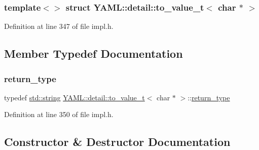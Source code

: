 \subsubsection*{template$<$$>$\newline
struct Y\+A\+M\+L\+::detail\+::to\+\_\+value\+\_\+t$<$ char $\ast$ $>$}



Definition at line 347 of file impl.\+h.



\subsection{Member Typedef Documentation}
\mbox{\label{struct_y_a_m_l_1_1detail_1_1to__value__t_3_01char_01_5_01_4_afaa36e2e46326f4b6d7c437104cc79e5}} 
\subsubsection{\texorpdfstring{return\_type}{return\_type}}
{\footnotesize\ttfamily typedef \mbox{\hyperlink{glad_8h_ac83513893df92266f79a515488701770}{std\+::string}} \mbox{\hyperlink{struct_y_a_m_l_1_1detail_1_1to__value__t}{Y\+A\+M\+L\+::detail\+::to\+\_\+value\+\_\+t}}$<$ char $\ast$ $>$\+::\mbox{\hyperlink{struct_y_a_m_l_1_1detail_1_1to__value__t_3_01char_01_5_01_4_afaa36e2e46326f4b6d7c437104cc79e5}{return\+\_\+type}}}



Definition at line 350 of file impl.\+h.



\subsection{Constructor \& Destructor Documentation}
\mbox{\label{struct_y_a_m_l_1_1detail_1_1to__value__t_3_01char_01_5_01_4_a572becb20cb9b1d5d1ffb34a5dcaef27}} 
